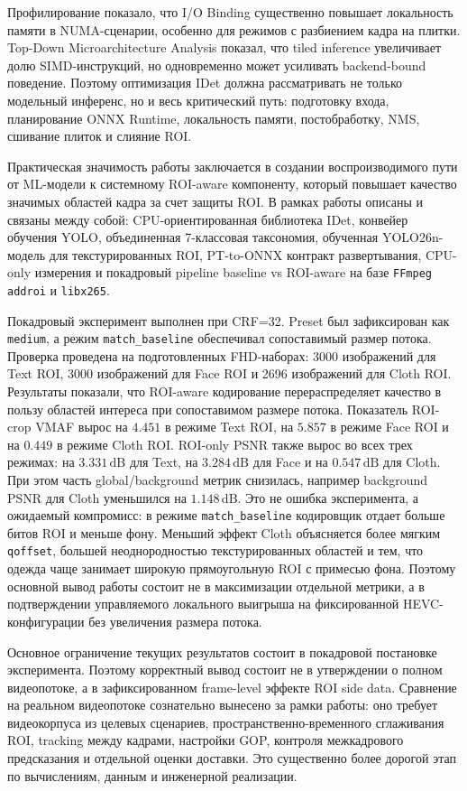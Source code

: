 \documentclass[12pt,a4paper,oneside,openany]{report}
\begin{document}
Профилирование показало, что I/O Binding существенно повышает локальность памяти в
NUMA-сценарии, особенно для режимов с разбиением кадра на плитки. Top-Down Microarchitecture
Analysis показал, что tiled inference увеличивает долю SIMD-инструкций, но одновременно может
усиливать backend-bound поведение. Поэтому оптимизация IDet должна рассматривать не только
модельный инференс, но и весь критический путь: подготовку входа, планирование ONNX Runtime,
локальность памяти, постобработку, NMS, сшивание плиток и слияние ROI.

Практическая значимость работы заключается в создании воспроизводимого пути от ML-модели к
системному ROI-aware компоненту, который повышает качество значимых областей кадра за счет
защиты ROI. В рамках работы описаны и связаны между собой: CPU-ориентированная библиотека IDet,
конвейер обучения YOLO, объединенная 7-классовая таксономия, обученная YOLO26n-модель для
текстурированных ROI, PT-to-ONNX контракт развертывания, CPU-only измерения и покадровый
pipeline baseline vs ROI-aware на базе \texttt{FFmpeg addroi} и \texttt{libx265}.

Покадровый эксперимент выполнен при CRF=32. Preset был зафиксирован как \texttt{medium}, а
режим \texttt{match\_baseline} обеспечивал сопоставимый размер потока. Проверка проведена на
подготовленных FHD-наборах: 3000 изображений для Text ROI, 3000 изображений для Face ROI и
2696 изображений для Cloth ROI. Результаты показали, что ROI-aware кодирование
перераспределяет качество в пользу областей интереса при сопоставимом размере потока.
Показатель ROI-crop VMAF вырос на $4.451$ в режиме Text ROI, на $5.857$ в режиме Face ROI и
на $0.449$ в режиме Cloth ROI.
ROI-only PSNR также вырос во всех трех режимах: на $3.331\,\mathrm{dB}$ для Text, на
$3.284\,\mathrm{dB}$ для Face и на $0.547\,\mathrm{dB}$ для Cloth. При этом часть
global/background метрик снизилась, например background PSNR для Cloth уменьшился на
$1.148\,\mathrm{dB}$. Это не ошибка эксперимента, а ожидаемый компромисс: в режиме
\texttt{match\_baseline} кодировщик отдает больше битов ROI и меньше фону. Меньший эффект Cloth объясняется
более мягким \texttt{qoffset}, большей неоднородностью текстурированных областей и тем, что
одежда чаще занимает широкую прямоугольную ROI с примесью фона. Поэтому основной вывод работы
состоит не в максимизации отдельной метрики, а в подтверждении управляемого локального выигрыша
на фиксированной HEVC-конфигурации без увеличения размера потока.

Основное ограничение текущих результатов состоит в покадровой постановке эксперимента. Поэтому
корректный вывод состоит не в утверждении о полном видеопотоке, а в зафиксированном frame-level
эффекте ROI side data. Сравнение на реальном видеопотоке сознательно вынесено за рамки работы:
оно требует видеокорпуса из целевых сценариев, пространственно-временного сглаживания ROI,
tracking между кадрами, настройки GOP, контроля межкадрового предсказания и отдельной оценки
доставки. Это существенно более дорогой этап по вычислениям, данным и инженерной реализации.
\end{document}

